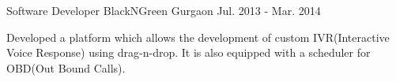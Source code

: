 \begin{cventries}
  \cventry
    {Software Developer} %
    {BlackNGreen} %
    {Gurgaon} %
    {Jul. 2013 - Mar. 2014} %
    {
     \vspace{13pt}
      \begin{cvitems} %
        \item {Developed a platform which allows the development of custom IVR(Interactive Voice Response) using drag-n-drop. It is also equipped with a scheduler for OBD(Out Bound Calls).}
      \end{cvitems}
    }
\end{cventries}

